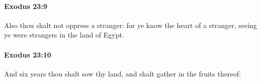 		\paragraph{Exodus 23:9} %
			\label{EXODUS-23-9}

			Also thou shalt not oppress a stranger: for ye know the heart of a stranger, seeing ye were strangers in the land of Egypt.


		\paragraph{Exodus 23:10} %
			\label{EXODUS-23-10}

			And six years thou shalt sow thy land, and shalt gather in the fruits thereof:



